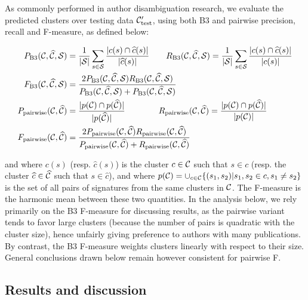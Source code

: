 \documentclass[runningheads,a4paper]{llncs}
\begin{document}
As commonly performed in author disambiguation research,
we evaluate the predicted clusters over testing data  ${\cal C}_\text{test}^\prime$,
using both B3 and pairwise precision, recall
and F-measure, as defined below:
\begin{small}
\begin{align}
P_\text{B3}({\cal C}, \widehat{\cal C}, {\cal S}) &= \frac{1}{|{\cal S}|} \sum_{s \in {\cal S}} \frac{|c(s) \cap \widehat{c}(s)|}{|\widehat{c}(s)|} \qquad
R_\text{B3}({\cal C}, \widehat{\cal C}, {\cal S}) = \frac{1}{|{\cal S}|} \sum_{s \in {\cal S}} \frac{|c(s) \cap \widehat{c}(s)|}{|c(s)|}\\
F_\text{B3}({\cal C}, \widehat{\cal C}, {\cal S}) &= \frac{2 P_\text{B3}({\cal C}, \widehat{\cal C}, {\cal S}) R_\text{B3}({\cal C}, \widehat{\cal C}, {\cal S})}{P_\text{B3}({\cal C}, \widehat{\cal C}, {\cal S}) + P_\text{B3}({\cal C}, \widehat{\cal C}, {\cal S})} \\
P_\text{pairwise}({\cal C}, \widehat{\cal C}) &= \frac{|p({\cal C}) \cap p(\widehat{\cal C})|}{|p(\widehat{\cal C})|} \qquad \qquad
R_\text{pairwise}({\cal C}, \widehat{\cal C}) = \frac{|p({\cal C}) \cap p(\widehat{\cal C})|}{|p({\cal C})|}\\
F_\text{pairwise}({\cal C}, \widehat{\cal C}) &= \frac{2 P_\text{pairwise}({\cal C}, \widehat{\cal C}) R_\text{pairwise}({\cal C}, \widehat{\cal C})}{P_\text{pairwise}({\cal C}, \widehat{\cal C}) + R_\text{pairwise}({\cal C}, \widehat{\cal C})}
\end{align}
\end{small}
and where $c(s)$ (resp. $\widehat{c}(s)$) is the cluster $c \in {\cal C}$ such that
$s \in c$ (resp. the cluster $\widehat{c} \in \widehat{\cal C}$ such that $s
\in \widehat{c}$), and where $p({\cal C}) = \cup_{c \in {\cal C}} \{ (s_1, s_2)
| s_1, s_2 \in c, s_1 \neq s_2 \}$ is the set of all pairs of signatures from
the same clusters in ${\cal C}$.
The F-measure is the harmonic mean between these two quantities.
In the analysis below, we rely primarily on the B3 F-measure for discussing results, as the pairwise variant
tends to favor large clusters (because the number of pairs is quadratic with the cluster size),
hence unfairly giving preference to authors with many publications.
By contrast, the B3 F-measure weights clusters linearly with respect to their size.
General conclusions drawn below remain however consistent for pairwise F.


\subsection{Results and discussion}
\end{document}
